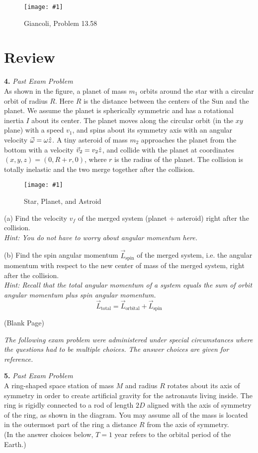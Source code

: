 \documentclass[11pt]{article}
\newcommand{\fig}[4]{
    \begin{figure}[H]
        \centering
        \texttt{[image: \#1]}
        \caption{#2}
        \label{exp4fit}
    \end{figure}
}
\theoremstyle{gangnamstyle}{\newtheorem{definition}{Definition}[]}
\theoremstyle{gangnamstyle}{\newtheorem{example}{Example}[]}
\theoremstyle{gangnamstyle}{\newtheorem{problem}{Problem}[]}
\begin{document}
\fig{figs/0801/tank.png}{Giancoli, Problem 13.58}{0.6}{0}

\pagebreak

\section{Review}

\textbf{4.} \textit{Past Exam Problem} \\
As shown in the figure, a planet of mass $m_1$ orbits around the star with a circular orbit of radius $R$. Here $R$ is the distance between the centers of the Sun and the planet. We assume the planet is spherically symmetric and has a rotational inertia $I$ about its center. The planet moves along the circular orbit (in the $xy$ plane) with a speed $v_1$, and spins about its symmetry axis with an angular velocity $\Vec{\omega} = \omega \Hat{z}$. A tiny asteroid of mass $m_2$ approaches the planet from the bottom with a velocity $\Vec{v}_2 = v_2 \Hat{z}$, and collide with the planet at coordinates $(x, y, z) = (0, R + r, 0)$, where $r$ is the radius of the planet. The collision is totally inelastic and the two merge together after the collision.

\fig{figs/mt2/105.png}{Star, Planet, and Astroid}{0.7}{0}

(a) Find the velocity $v_f$ of the merged system (planet + asteroid) right after the collision. \\
\textit{Hint: You do not have to worry about angular momentum here.}

(b) Find the spin angular momentum $\Vec{L}_{\text{spin}}$ of the merged system, i.e. the angular momentum with respect to the new center of mass of the merged system, right after the collision. \\
\textit{Hint: Recall that the total angular momentum of a system equals the sum of orbit angular momentum plus spin angular momentum.}
\[ \Vec{L}_{\text{total}} = \Vec{L}_{\text{orbital}} + \Vec{L}_{\text{spin}} \]

\pagebreak

\begin{center}
(Blank Page)
\end{center}

\pagebreak

\textit{The following exam problem were administered under special circumstances where the questions had to be multiple choices. The answer choices are given for reference.} 

\textbf{5.} \textit{Past Exam Problem} \\
A ring-shaped space station of mass $M$ and radius $R$ rotates about its axis of symmetry in order to create artificial gravity for the astronauts living inside. The ring is rigidly connected to a rod of length $2D$ aligned with the axis of symmetry of the ring, as shown in the diagram. You may assume all of the mass is located in the outermost part of the ring a distance $R$ from the axis of symmetry. \\
(In the answer choices below, $T = 1$ year refers to the orbital period of the Earth.) 
\end{document}
